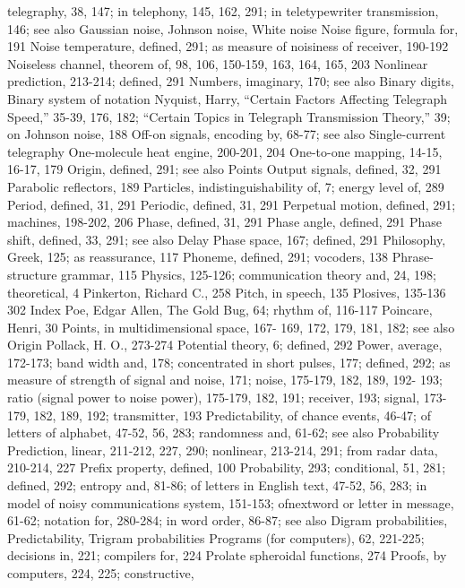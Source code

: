 {{{{{{{{{{{{{{{telegraphy, 38, 147; in telephony,
145, 162, 291; in teletypewriter
transmission, 146; see also Gaussian
noise, Johnson noise, White
noise
Noise figure, formula for, 191
Noise temperature, defined, 291; as
measure of noisiness of receiver,
190-192
Noiseless channel, theorem of, 98, 106,
150-159, 163, 164, 165, 203
Nonlinear prediction, 213-214; defined,
291
Numbers, imaginary, 170; see also
Binary digits, Binary system of notation
Nyquist, Harry, “Certain Factors Affecting
Telegraph Speed,” 35-39,
176, 182; “Certain Topics in Telegraph
Transmission Theory,” 39;
on Johnson noise, 188
Off-on signals, encoding by, 68-77; see
also Single-current telegraphy
One-molecule heat engine, 200-201, 204
One-to-one mapping, 14-15, 16-17, 179
Origin, defined, 291; see also Points
Output signals, defined, 32, 291
Parabolic reflectors, 189
Particles, indistinguishability of, 7;
energy level of, 289
Period, defined, 31, 291
Periodic, defined, 31, 291
Perpetual motion, defined, 291; machines,
198-202, 206
Phase, defined, 31, 291
Phase angle, defined, 291
Phase shift, defined, 33, 291; see also
Delay
Phase space, 167; defined, 291
Philosophy, Greek, 125; as reassurance,
117
Phoneme, defined, 291; vocoders, 138
Phrase-structure grammar, 115
Physics, 125-126; communication
theory and, 24, 198; theoretical, 4
Pinkerton, Richard C., 258
Pitch, in speech, 135
Plosives, 135-136
302 Index
Poe, Edgar Allen, The Gold Bug, 64;
rhythm of, 116-117
Poincare, Henri, 30
Points, in multidimensional space, 167-
169, 172, 179, 181, 182; see also
Origin
Pollack, H. O., 273-274
Potential theory, 6; defined, 292
Power, average, 172-173; band width
and, 178; concentrated in short
pulses, 177; defined, 292; as measure
of strength of signal and noise,
171; noise, 175-179, 182, 189, 192-
193; ratio (signal power to noise
power), 175-179, 182, 191; receiver,
193; signal, 173-179, 182, 189, 192;
transmitter, 193
Predictability, of chance events, 46-47;
of letters of alphabet, 47-52, 56,
283; randomness and, 61-62; see
also Probability
Prediction, linear, 211-212, 227, 290;
nonlinear, 213-214, 291; from radar
data, 210-214, 227
Prefix property, defined, 100
Probability, 293; conditional, 51, 281;
defined, 292; entropy and, 81-86;
of letters in English text, 47-52, 56,
283; in model of noisy communications
system, 151-153; ofnextword
or letter in message, 61-62; notation
for, 280-284; in word order,
86-87; see also Digram probabilities,
Predictability, Trigram probabilities
Programs (for computers), 62, 221-225;
decisions in, 221; compilers for,
224
Prolate spheroidal functions, 274
Proofs, by computers, 224, 225; constructive,
}}}}}}}}}}}}}}}
